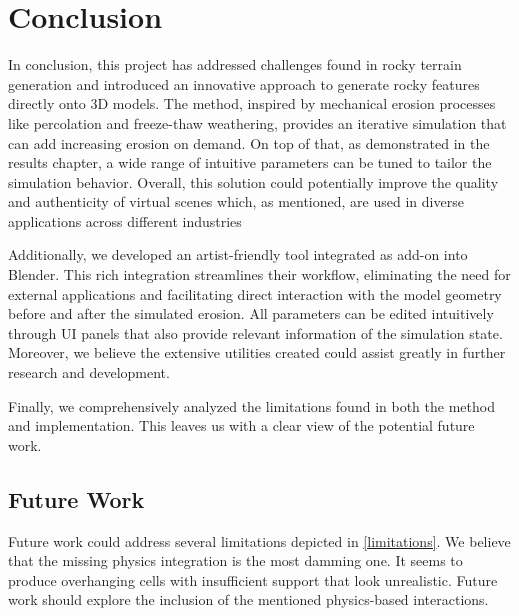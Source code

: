 \chapter{Conclusion}\label{chapter:Conclusion}

In conclusion, this project has addressed challenges found in rocky terrain generation and introduced an innovative approach to generate rocky features directly onto 3D models. The method, inspired by mechanical erosion processes like percolation and freeze-thaw weathering, provides an iterative simulation that can add increasing erosion on demand. On top of that, as demonstrated in the results chapter, a wide range of intuitive parameters can be tuned to tailor the simulation behavior. Overall, this solution could potentially improve the quality and authenticity of virtual scenes which, as mentioned, are used in diverse applications across different industries

\vspace{0.5\baselineskip}
Additionally, we developed an artist-friendly tool integrated as add-on into Blender. This rich integration streamlines their workflow, eliminating the need for external applications and facilitating direct interaction with the model geometry before and after the simulated erosion. All parameters can be edited intuitively through UI panels that also provide relevant information of the simulation state. Moreover, we believe the extensive utilities created could assist greatly in further research and development. 

\vspace{0.5\baselineskip}
Finally, we comprehensively analyzed the limitations found in both the method and implementation. This leaves us with a clear view of the potential future work.


\clearpage
\section{Future Work}

Future work could address several limitations depicted in \ref{limitations}. We believe that the missing physics integration is the most damming one. It seems to produce overhanging cells with insufficient support that look unrealistic. Future work should explore the inclusion of the mentioned physics-based interactions.

